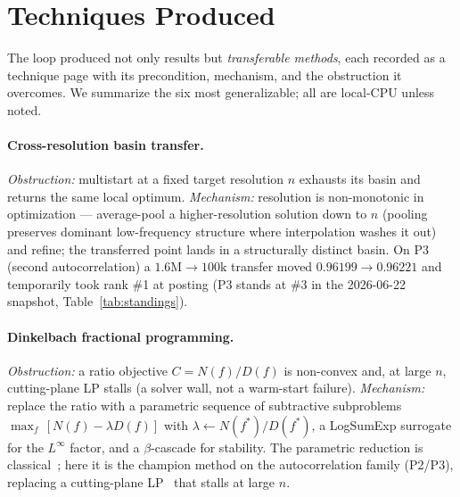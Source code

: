\documentclass[11pt]{article}
\newcommand{\src}[1]{}
\begin{document}
\section{Techniques Produced}
\label{sec:techniques}

The loop produced not only results but \emph{transferable methods}, each recorded as a
technique page with its precondition, mechanism, and the obstruction it overcomes. We
summarize the six most generalizable; all are local-CPU unless noted.

\paragraph{Cross-resolution basin transfer.}
\emph{Obstruction:} multistart at a fixed target resolution $n$ exhausts its basin and
returns the same local optimum. \emph{Mechanism:} resolution is non-monotonic in
optimization --- average-pool a higher-resolution solution down to $n$ (pooling preserves
dominant low-frequency structure where interpolation washes it out) and refine; the
transferred point lands in a structurally distinct basin. On P3 (second autocorrelation) a
$1.6\text{M}\to 100\text{k}$ transfer moved $0.96199\to 0.96221$ and temporarily took rank \#1
at posting (P3 stands at \#3 in the 2026-06-22 snapshot, Table~\ref{tab:standings}).
\src{techniques/cross-resolution-basin-transfer.md}

\paragraph{Dinkelbach fractional programming.}
\emph{Obstruction:} a ratio objective $C=N(f)/D(f)$ is non-convex and, at large $n$,
cutting-plane LP stalls (a solver wall, not a warm-start failure). \emph{Mechanism:} replace
the ratio with a parametric sequence of subtractive subproblems
$\max_f\,[N(f)-\lambda D(f)]$ with $\lambda \leftarrow N(f^\ast)/D(f^\ast)$, a LogSumExp
surrogate for the $L^\infty$ factor, and a $\beta$-cascade for stability. The parametric
reduction is classical~\cite{dinkelbach1967fractional}; here it is the champion method on the
autocorrelation family (P2/P3), replacing a cutting-plane LP~\cite{lee2015cuttingplane,matolcsi2010autoconvolution}
that stalls at large $n$. \src{techniques/dinkelbach-fractional-programming.md,
concepts/fractional-programming-dinkelbach.md}
\end{document}
